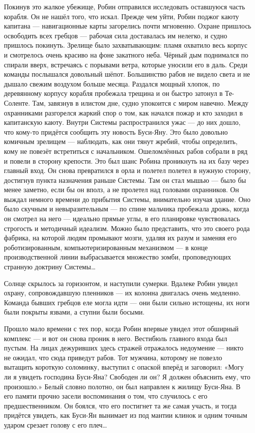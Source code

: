\documentclass[a4paper,12pt]{book}
\begin{document}
	Покинув это жалкое убежище, Робин отправился исследовать оставшуюся часть корабля. Он не нашёл того, что искал.
	Прежде чем уйти, Робин поджог каюту капитана — навигационные карты загорелись почти мгновенно. Охране пришлось освободить всех гребцов — рабочая сила доставалась им нелегко, и судно пришлось покинуть. Зрелище было захватывающим: пламя охватило весь корпус и смотрелось очень красиво на фоне закатного неба. Чёрный дым поднимался по спирали вверх, встречаясь с порывами ветра, которые уносили его в даль.
	Среди команды послышался довольный шёпот. Большинство рабов не видело света и не дышало свежим воздухом больше месяца. Раздался мощный хлопок, по деревянному корпусу корабля пробежала трещина и он быстро затонул в Те-Соленте. Там, завязнув в илистом дне, судно упокоится с миром навечно.
	Между охранниками разгорелся жаркий спор о том, как начался пожар и кто заходил в капитанскую каюту. Внутри Системы распространился ужас — до них дошло, что кому-то придётся сообщить эту новость Буси-Яну. Это было довольно комичным зрелищем — наблюдать, как они тянут жребий, чтобы определить, кому не повезёт встретиться с начальником.
	Ошеломлённых рабов собрали в ряд и повели в сторону крепости.
	Это был шанс Робина проникнуть на их базу через главный вход. Он снова превратился в орла и полетел полетел в нужную сторону, достигнув пункта назначения раньше Системы. Там он стал мышью — было бы менее заметно, если бы он вполз, а не пролетел над головами охранников.
	Он выждал немного времени до прибытия Системы, внимательно изучая здание. Оно было скучным и невыразительным — по спине мальчика пробежала дрожь, когда он смотрел на него — идеально прямые углы, в его планировке чувствовалась строгость и методичный идеализм. Можно было представить, что это своего рода фабрика, на которой людям промывают мозги, удаляя их разум и заменяя его роботизированным, компьютеризированным механизмом — в конце производственной линии выбрасывается множество зомби, проповедующих странную доктрину Системы…

	Солнце скрылось за горизонтом, и наступили сумерки. Вдалеке Робин увидел охрану, сопровождавшую пленников — их колонна двигалась очень медленно. Команда бывших гребцов еле могла идти — они были сильно истощены, их ноги были покрыты язвами, а ступни были босыми.

	Прошло мало времени с тех пор, когда Робин впервые увидел этот обширный комплекс — и вот он снова проник в него. Вестибюль главного входа был пустым. На лицах дежуривших здесь стражей отражалось недоумение — никто не ожидал, что сюда приведут рабов.
	Тот мужчина, которому не повезло вытащить короткую соломинку, выступил с опаской вперёд и заговорил:
	«Могу ли я увидеть господина Буси-Яна? Свободен ли он? Я должен объяснить ему, что произошло.»
	Белый словно полотно, он был направлен к жилищу Буси-Яна. В его памяти прочно засели воспоминания о том, что случилось с его предшественником. Он боялся, что его постигнет та же самая участь, и тогда придётся увидеть, как Буси-Ян вынимает из под мантии клинок и одним точным ударом срезает голову с его плеч…
\end{document}
